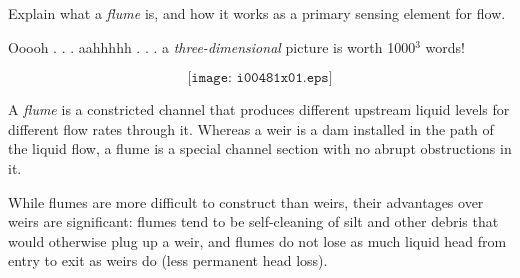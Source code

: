 

Explain what a {\it flume} is, and how it works as a primary sensing element for flow.







Ooooh . . . aahhhhh . . . a {\it three-dimensional} picture is worth 1000$^{3}$ words!

$$\texttt{[image: i00481x01.eps]}$$

A {\it flume} is a constricted channel that produces different upstream liquid levels for different flow rates through it.  Whereas a weir is a dam installed in the path of the liquid flow, a flume is a special channel section with no abrupt obstructions in it.

While flumes are more difficult to construct than weirs, their advantages over weirs are significant: flumes tend to be self-cleaning of silt and other debris that would otherwise plug up a weir, and flumes do not lose as much liquid head from entry to exit as weirs do (less permanent head loss).











